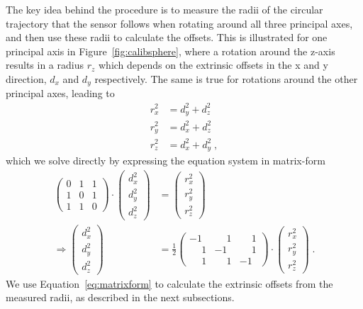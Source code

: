 The key idea behind the procedure is to measure the radii of the circular trajectory that the sensor follows when rotating around all three principal axes, and then use these radii to calculate the offsets.
This is illustrated for one principal axis in Figure~\ref{fig:calibsphere}, where a rotation around the z-axis results in a radius $r_z$ which depends on the extrinsic offsets in the x and y direction, $d_x$ and $d_y$ respectively.
The same is true for rotations around the other principal axes, leading to  
\begin{align}
  r_x^2 &= d_y^2 + d_z^2 \nonumber \\
  r_y^2 &= d_x^2 + d_z^2 \nonumber \\
  r_z^2 &= d_x^2 + d_y^2 \;,
  \label{eq:equationsystem}
\end{align}
which we solve directly by expressing the equation system in matrix-form
\begin{align}
  \begin{pmatrix}
    0 & 1 & 1 \\
    1 & 0 & 1 \\
    1 & 1 & 0
  \end{pmatrix}
  \cdot 
  \begin{pmatrix}
    d_x^2 \\
    d_y^2 \\
    d_z^2
  \end{pmatrix}
  &= 
  \begin{pmatrix}
    r_x^2 \\
    r_y^2 \\
    r_z^2
  \end{pmatrix} \nonumber \\
  \Rightarrow
  \begin{pmatrix}
    d_x^2 \\
    d_y^2 \\
    d_z^2
  \end{pmatrix}
  &= \frac{1}{2}
  \begin{pmatrix}
    -1 & \phantom{-}1 & \phantom{-}1 \\
    \phantom{-}1 & -1 & \phantom{-}1 \\
    \phantom{-}1 &  \phantom{-}1 & -1
  \end{pmatrix} 
  \cdot 
  \begin{pmatrix}
    r_x^2 \\
    r_y^2 \\
    r_z^2
  \end{pmatrix}\;.
  \label{eq:matrixform}
\end{align}
We use Equation~\eqref{eq:matrixform} to calculate the extrinsic offsets from the measured radii, as described in the next subsections.

